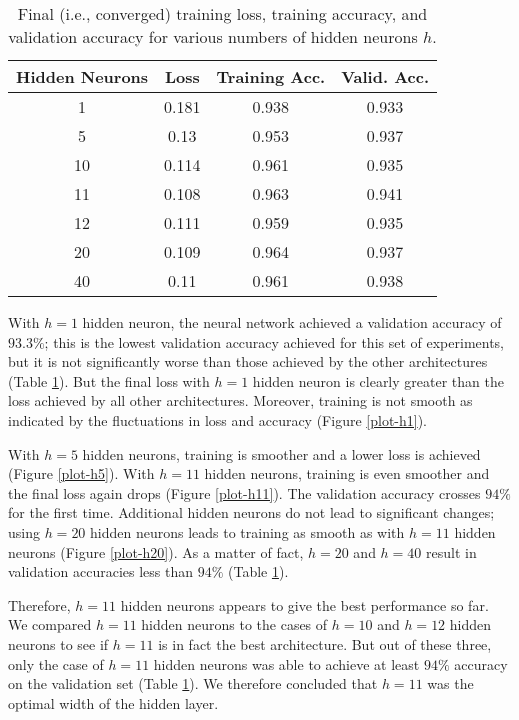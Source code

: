 \documentclass[12pt]{article}
\begin{document}
\begin{table}
\centering
\begin{tabular}{|c|c|c|c|} \hline
Hidden Neurons & Loss & Training Acc. & Valid. Acc. \\ \hline
1 & 0.181 & 0.938 & 0.933 \\
5 & 0.13 & 0.953 & 0.937 \\
10 & 0.114 & 0.961 & 0.935 \\
11 & 0.108 & 0.963 & 0.941 \\
12 & 0.111 & 0.959 & 0.935 \\
20 & 0.109 & 0.964 & 0.937 \\
40 & 0.11 & 0.961 & 0.938 \\
 \hline
\end{tabular}
\caption{\label{table1} Final (i.e., converged) training loss, training accuracy, and validation accuracy for various numbers of hidden neurons $h$.}
\end{table}

With $h=1$ hidden neuron, the neural network achieved a validation accuracy of $93.3\%$; this is the lowest validation accuracy achieved for this set of experiments, but it is not significantly worse than those achieved by the other architectures (Table \ref{table1}). But the final loss with $h=1$ hidden neuron is clearly greater than the loss achieved by all other architectures. Moreover, training is not smooth as indicated by the fluctuations in loss and accuracy (Figure \ref{plot-h1}).

With $h=5$ hidden neurons, training is smoother and a lower loss is achieved (Figure \ref{plot-h5}). With $h=11$ hidden neurons, training is even smoother and the final loss again drops (Figure \ref{plot-h11}). The validation accuracy crosses $94\%$ for the first time. Additional hidden neurons do not lead to significant changes; using $h=20$ hidden neurons leads to training as smooth as with $h=11$ hidden neurons (Figure \ref{plot-h20}). As a matter of fact, $h=20$ and $h=40$ result in validation accuracies less than $94\%$ (Table \ref{table1}).

Therefore, $h=11$ hidden neurons appears to give the best performance so far. We compared $h=11$ hidden neurons to the cases of $h=10$ and $h=12$ hidden neurons to see if $h=11$ is in fact the best architecture. But out of these three, only the case of $h=11$ hidden neurons was able to achieve at least $94\%$ accuracy on the validation set (Table \ref{table1}). We therefore concluded that $h=11$ was the optimal width of the hidden layer.
\end{document}
